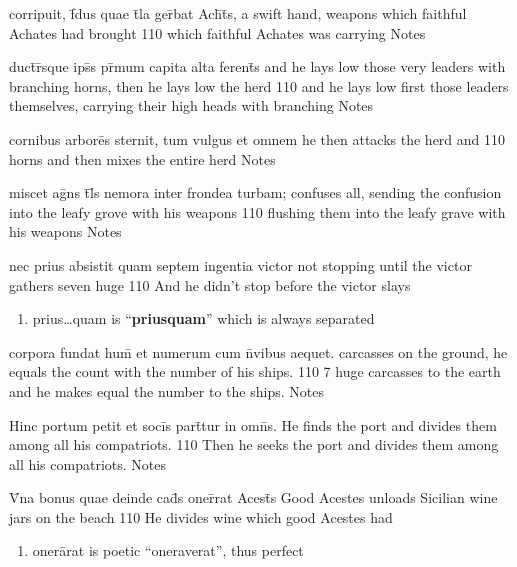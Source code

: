 \documentclass[]{book}
\begin{document}
\latline
  {corripuit, f\={\macron {\i}}dus quae t\={}la ger\={}bat Ach\={}t\={}s,}
  { a swift hand, weapons which faithful Achates had brought  }
  {110}
  { which faithful Achates was carrying }
  { Notes }


\latline
  {duct\={}r\={}sque ips\={}s pr\={\macron {\i}}mum capita alta ferent\={\macron {\i}}s}
  { and he lays low those very leaders with branching horns, then he lays low the herd  }
  {110}
  { and he lays low first those leaders themselves, carrying their high heads with branching  }
  { Notes }



\latline
  {cornibus arbore\={\macron {\i}}s sternit, tum vulgus et omnem}
  { he then attacks the herd and  }
  {110}
  { horns and then mixes the entire herd }
  { Notes }


\latline
  {miscet ag\={}ns t\={}l\={\macron {\i}}s nemora inter frondea turbam;}
  { confuses all, sending the confusion into the leafy grove with his weapons }
  {110}
  { flushing them into the leafy grave with his weapons }
  { Notes }


\latline
  {nec prius absistit quam septem ingentia victor }
  { not stopping until the victor gathers seven huge }
  {110}
  { And he didn't stop before the victor slays }
  { \begin{enumerate}
  	\item prius{\ldots}quam is ``\textbf{priusquam}'' which is always separated
  \end{enumerate} }



\latline
  {corpora fundat hum\={\macron {\i}} et numerum cum n\={}vibus aequet.}
  { carcasses on the ground, he equals the count with the number of his ships. }
  {110}
  { 7 huge carcasses to the earth and he makes equal the number to the ships. }
  { Notes }


\latline
  {Hinc portum petit et soci\={}s part\={\macron {\i}}tur in omn\={\macron {\i}}s.}
  { He finds the port and divides them among all his compatriots. }
  {110}
  { Then he seeks the port and divides them among all his compatriots. }
  { Notes }


\latline
  {V\={\macron {\i}}na bonus quae deinde cad\={\macron {\i}}s oner\={}rat Acest\={}s}
  { Good Acestes unloads Sicilian wine jars on the beach }
  {110}
  { He divides wine which good Acestes had  }
  { \begin{enumerate}
  	\item oner\={a}rat is poetic ``oneraverat'', thus perfect
  \end{enumerate} }
\end{document}
